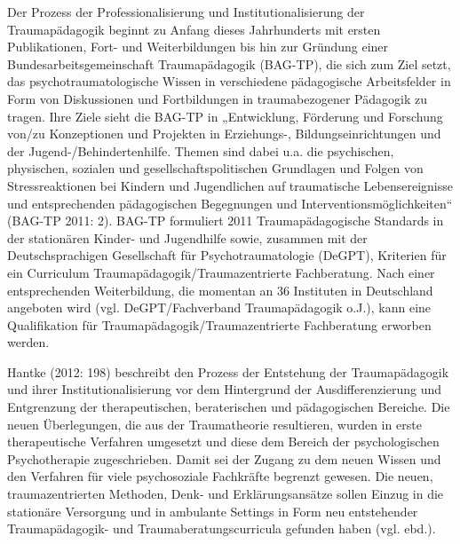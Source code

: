 Der Prozess der Professionalisierung und Institutionalisierung der Traumapädagogik beginnt zu Anfang dieses Jahrhunderts mit ersten Publikationen, Fort- und Weiterbildungen bis hin zur Gründung einer Bundesarbeitsgemeinschaft Traumapädagogik (BAG-TP), die sich zum Ziel setzt, das psychotraumatologische Wissen in verschiedene pädagogische Arbeitsfelder in Form von Diskussionen und Fortbildungen in traumabezogener Pädagogik zu tragen. Ihre Ziele sieht die BAG-TP in „Entwicklung, Förderung und Forschung von/zu Konzeptionen und Projekten in Erziehungs-, Bildungseinrichtungen und der Jugend-/Behindertenhilfe. Themen sind dabei u.a. die psychischen, physischen, sozialen und gesellschaftspolitischen Grundlagen und Folgen von Stressreaktionen bei Kindern und Jugendlichen auf traumatische Lebensereignisse und entsprechenden pädagogischen Begegnungen und Interventionsmöglichkeiten“ (BAG-TP 2011: 2). BAG-TP formuliert 2011 Traumapädagogische Standards in der stationären Kinder- und Jugendhilfe sowie, zusammen mit der Deutschsprachigen Gesellschaft für Psychotraumatologie (DeGPT), Kriterien für ein Curriculum Traumapädagogik/Traumazentrierte Fachberatung. Nach einer entsprechenden Weiterbildung, die momentan an 36 Instituten in Deutschland angeboten wird (vgl. DeGPT/Fachverband Traumapädagogik o.J.), kann eine Qualifikation für Traumapädagogik/Traumazentrierte Fachberatung erworben werden.

Hantke (2012: 198) beschreibt den Prozess der Entstehung der Traumapädagogik und ihrer Institutionalisierung vor dem Hintergrund der Ausdifferenzierung und Entgrenzung der therapeutischen, beraterischen und pädagogischen Bereiche. Die neuen Überlegungen, die aus der Traumatheorie resultieren, wurden in erste therapeutische Verfahren umgesetzt und diese dem Bereich der psychologischen Psychotherapie zugeschrieben. Damit sei der Zugang zu dem neuen Wissen und den Verfahren für viele psychosoziale Fachkräfte begrenzt gewesen. Die neuen, traumazentrierten Methoden, Denk- und Erklärungsansätze sollen Einzug in die stationäre Versorgung und in ambulante Settings in Form neu entstehender Traumapädagogik- und Traumaberatungscurricula gefunden haben (vgl. ebd.).
